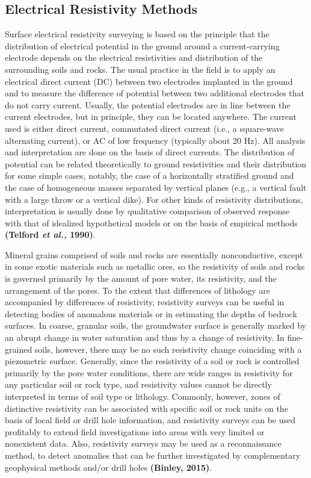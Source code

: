 \documentclass[12pt,a4paper]{report}
\begin{document}
\subsection{Electrical Resistivity Methods}
Surface electrical resistivity surveying is based on the principle that the distribution of electrical potential in the ground around a current-carrying electrode depends on the electrical resistivities and distribution of the surrounding soils and rocks.  The usual practice in the field is to apply an electrical direct current (DC) between two electrodes implanted in the ground and to measure the difference of potential between two additional electrodes that do not carry current.  Usually, the potential electrodes are in line between the current electrodes, but in principle, they can be located anywhere.  The current used is either direct current, commutated direct current (i.e., a square-wave alternating current), or AC of low frequency (typically about 20 Hz).  All analysis and interpretation are done on the basis of direct currents.  The distribution of potential can be related theoretically to ground resistivities and their distribution for some simple cases, notably, the case of a horizontally stratified ground and the case of homogeneous masses separated by vertical planes (e.g., a vertical fault with a large throw or a vertical dike).  For other kinds of resistivity distributions, interpretation is usually done by qualitative comparison of observed response with that of idealized hypothetical models or on the basis of empirical methods \textbf{(Telford \textit{et al.,} 1990)}.

Mineral grains comprised of soils and rocks are essentially nonconductive, except in some exotic materials such as metallic ores, so the resistivity of soils and rocks is governed primarily by the amount of pore water, its resistivity, and the arrangement of the pores.  To the extent that differences of lithology are accompanied by differences of resistivity, resistivity surveys can be useful in detecting bodies of anomalous materials or in estimating the depths of bedrock surfaces.  In coarse, granular soils, the groundwater surface is generally marked by an abrupt change in water saturation and thus by a change of resistivity.  In fine-grained soils, however, there may be no such resistivity change coinciding with a piezometric surface.  Generally, since the resistivity of a soil or rock is controlled primarily by the pore water conditions, there are wide ranges in resistivity for any particular soil or rock type, and resistivity values cannot be directly interpreted in terms of soil type or lithology.  Commonly, however, zones of distinctive resistivity can be associated with specific soil or rock units on the basis of local field or drill hole information, and resistivity surveys can be used profitably to extend field investigations into areas with very limited or nonexistent data.  Also, resistivity surveys may be used as a reconnaissance method, to detect anomalies that can be further investigated by complementary geophysical methods and/or drill holes \textbf{(Binley, 2015)}.
\end{document}
